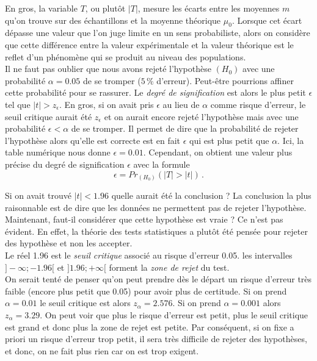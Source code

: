 \documentclass[12pt, a4paper]{book}
\numberwithin{equation}{section}
\begin{document}
En gros, la variable $T$, ou plutôt $|T|$, mesure les écarts entre les moyennes $m$ qu'on trouve sur des échantillons et la moyenne théorique $\mu_0$. 
Lorsque cet écart dépasse une valeur que l'on juge limite en un sens probabiliste, alors on considère que cette différence entre 
la valeur expérimentale et la valeur théorique est le reflet d'un phénomène qui se produit au niveau des
populations.\\


 Il ne faut pas oublier que nous avons rejeté l'hypothèse $(H_0)$ avec une probabilité $\alpha=0.05$ de se tromper ($5\,\%$ d'erreur). Peut-être pourrions affiner cette probabilité pour se rassurer.
Le {\it degré de signification} est alors le plus petit $\epsilon$ tel que $|t|>z_\epsilon$.  
En gros, si on avait pris $\epsilon$ au lieu de $\alpha$ comme risque d'erreur, le seuil critique aurait été
$z_\epsilon$ et on aurait encore rejeté l'hypothèse mais avec une probabilité $\epsilon<\alpha$ de se tromper.
Il permet de dire que la probabilité de rejeter l'hypothèse alors qu'elle est correcte est en fait $\epsilon$ qui est plus petit que $\alpha$.
Ici, la table numérique nous donne $\epsilon = 0.01$. %
Cependant, on obtient une valeur plus précise du degré de signification $\epsilon$ avec la formule
\[ \epsilon = Pr_{(H_0)}(|T|>|t|)\,.\]

 Si on avait trouvé $|t| < 1.96$ quelle aurait été la conclusion ? 
La conclusion la plus raisonnable est de dire que les données ne permettent pas de
rejeter l'hypothèse. Maintenant, faut-il considérer que cette hypothèse est vraie ? Ce n'est pas 
évident. En effet, la théorie des tests statistiques a plutôt été pensée pour rejeter des hypothèse
et non les accepter.\\

 Le réel 1.96 est le {\it seuil critique} associé au risque d'erreur 0.05.
les intervalles $]-\infty ; -1.96[$ et $]1.96 ; +\infty[$ forment la {\it zone de rejet} du test.\\

 On serait tenté de penser qu'on peut prendre dès le départ un risque d'erreur très
faible (encore plus petit que 0.05) pour avoir plus de certitude. Si on prend $\alpha= 0.01$ le seuil 
critique est alors $z_{\alpha}=2.576$. Si on prend $\alpha= 0.001$ alors $z_{\alpha}=3.29$. On peut 
voir que
plus le risque d'erreur est petit, plus le seuil critique est grand et donc plus la zone de rejet est petite.
Par conséquent, si on fixe a priori un risque d'erreur trop petit, il sera très difficile de rejeter des hypothèses, et donc, on ne fait plus rien car on est trop exigent.\\
\end{document}
